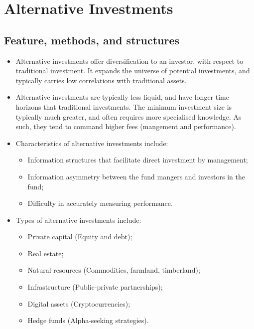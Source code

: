 \documentclass[../notes_compiled.tex]{subfiles}
\begin{document}
\section{Alternative Investments}

\subsection{Feature, methods, and structures}
\begin{itemize}
\item Alternative investments offer diversification to an investor, with respect to traditional investment. It expands the universe of potential investments, and typically carries low correlations with traditional assets.
\item Alternative investments are typically less liquid, and have longer time horizons that traditional investments. The minimum investment size is typically much greater, and often requires more specialised knowledge. As such, they tend to command higher fees (mangement and performance).

\item Characteristics of alternative investments include:
\begin{itemize}
\item Information structures that facilitate direct investment by management;
\item Information asymmetry between the fund mangers and investors in the fund;
\item Difficulty in accurately measuring performance.
\end{itemize}

\item Types of alternative investments include:
\begin{itemize}
\item Private capital (Equity and debt);
\item Real estate;
\item Natural resources (Commodities, farmland, timberland);
\item Infrastructure (Public-private partnerships);
\item Digital assets (Cryptocurrencies);
\item Hedge funds (Alpha-seeking strategies).
\end{itemize}


\end{itemize}
\end{document}
